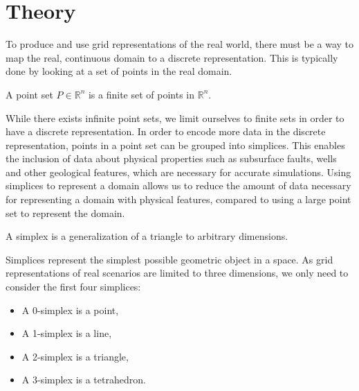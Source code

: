 \section{Theory}
To produce and use grid representations of the real world, there must be a way to map the real, continuous domain to a discrete representation. This is typically done by looking at a set of points in the real domain.

\begin{definition}
A point set $P \in \mathbb{R}^n$ is a finite set of points in $\mathbb{R}^n$.
\end{definition}
While there exists infinite point sets, we limit ourselves to finite sets in order to have a discrete representation. In order to encode more data in the discrete representation, points in a point set can be grouped into simplices. This enables the inclusion of data about physical properties such as subsurface faults, wells and other geological features, which are necessary for accurate simulations. Using simplices to represent a domain allows us to reduce the amount of data necessary for representing a domain with physical features, compared to using a large point set to represent the domain.


\begin{definition}[Simplex]
A simplex is a generalization of a triangle to arbitrary dimensions.
\end{definition}
Simplices represent the simplest possible geometric object in a space. As grid representations of real scenarios are limited to three dimensions, we only need to consider the first four simplices:
\begin{itemize}
    \item A 0-simplex is a point,
    \item A 1-simplex is a line,
    \item A 2-simplex is a triangle,
    \item A 3-simplex is a tetrahedron.
\end{itemize}

